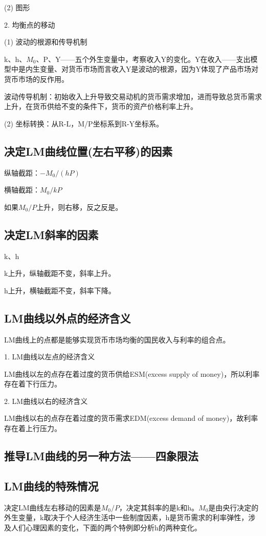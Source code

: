 \documentclass{article}
\begin{document}
(2) 图形

\hspace*{\fill}

2. 均衡点的移动

(1) 波动的根源和传导机制

k、h、$ M_0 $、P、Y——五个外生变量中，考察收入Y的变化。Y在收入——支出模型中是内生变量、对货币市场而言收入Y是波动的根源，因为Y体现了产品市场对货币市场的反作用。

波动传导机制：初始收入上升导致交易动机的货币需求增加，进而导致总货币需求上升，在货币供给不变的条件下，货币的资产价格利率上升。

(2) 坐标转换：从R-L，M/P坐标系到R-Y坐标系。

\subsection{决定LM曲线位置(左右平移)的因素}
纵轴截距：$ -M_0/(hP) $

横轴截距：$ M_0/kP $

如果$ M_0/P $上升，则右移，反之反是。

\subsection{决定LM斜率的因素}
k、h

k上升，纵轴截距不变，斜率上升。

h上升，横轴截距不变，斜率下降。

\subsection{LM曲线以外点的经济含义}
LM曲线上的点都是能够实现货币市场均衡的国民收入与利率的组合点。

1. LM曲线以左点的经济含义

LM曲线以左的点存在着过度的货币供给ESM(excess supply of money)，所以利率存在着下行压力。

2. LM曲线以右的经济含义

LM曲线以右的点存在着过度的货币需求EDM(excess demand of money)，故利率存在着上行压力。

\subsection{推导LM曲线的另一种方法——四象限法}

\subsection{LM曲线的特殊情况}
决定LM曲线左右移动的因素是$ M_0/P $，决定其斜率的是k和h。$ M_0 $是由央行决定的外生变量，k取决于个人经济生活中一些制度因素，h是货币需求的利率弹性，涉及人们心理因素的变化，下面的两个特例即分析h的两种变化。
\end{document}
